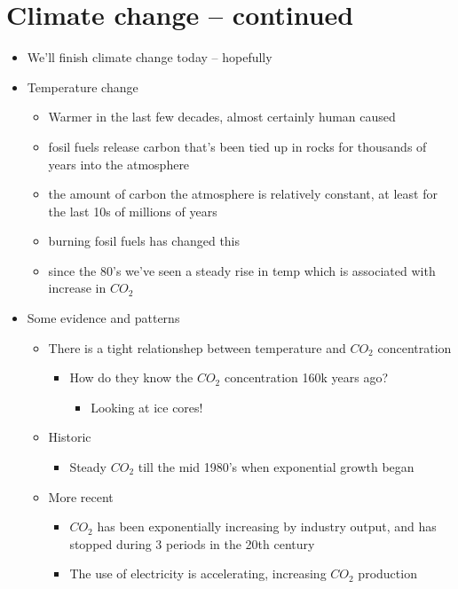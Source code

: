 \documentclass{article}
\theoremstyle{definition}
\begin{document}
\section{Climate change -- continued}
\begin{itemize}
	\item We'll finish climate change today -- hopefully
	\item Temperature change
		\begin{itemize}
			\item Warmer in the last few decades, almost certainly human caused
			\item fosil fuels release carbon that's been tied up in rocks for thousands of years into the atmosphere
			\item the amount of carbon the atmosphere is relatively constant, at least for the last 10s of millions of years
			\item burning fosil fuels has changed this
			\item since the 80's we've seen a steady rise in temp which is associated with increase in $CO_2$
		\end{itemize}
	\item Some evidence and patterns
		\begin{itemize}
			\item There is a tight relationshep between temperature and $CO_2$ concentration
				\begin{itemize}
					\item How do they know the $CO_2$ concentration 160k years ago?
						\begin{itemize}
							\item Looking at ice cores!
						\end{itemize}
				\end{itemize}
			\item Historic
				\begin{itemize}
					\item Steady $CO_2$ till the mid 1980's when exponential growth began
				\end{itemize}
			\item More recent
				\begin{itemize}
					\item $CO_2$ has been exponentially increasing by industry output, and has stopped during 3 periods in the 20th century
					\item The use of electricity is accelerating, increasing $CO_2$ production
				\end{itemize}

\end{itemize}
\end{itemize}
\end{document}
